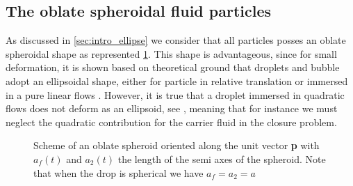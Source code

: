 \subsection{The oblate spheroidal fluid particles}


As discussed in \ref{sec:intro_ellipse} we consider that all particles posses an oblate spheroidal shape as represented \ref{fig:scheme_spheroid}. 
This shape is advantageous, since for small deformation, it is shown based on theoretical ground that droplets and bubble adopt an ellipsoidal shape, either for particle in relative translation \citep{taylor1964deformation} or immersed in a pure linear flows \citet{leal2007advanced}. 
However, it is true that a droplet immersed in quadratic flows does not deform as an ellipsoid, see \citep{nadim1991motion}, meaning that for instance we must neglect the quadratic contribution for the carrier fluid in the closure problem. 
\begin{figure}[h!]
    \centering
    \hfill
    \hfill
    \caption{Scheme of an  oblate spheroid oriented along the unit vector \textbf{p} with $a_f(t)$ and $a_2(t)$ the length of the semi axes of the spheroid.
    Note that when the drop is spherical we have $a_f=a_2=a$}
    \label{fig:scheme_spheroid}
\end{figure}

